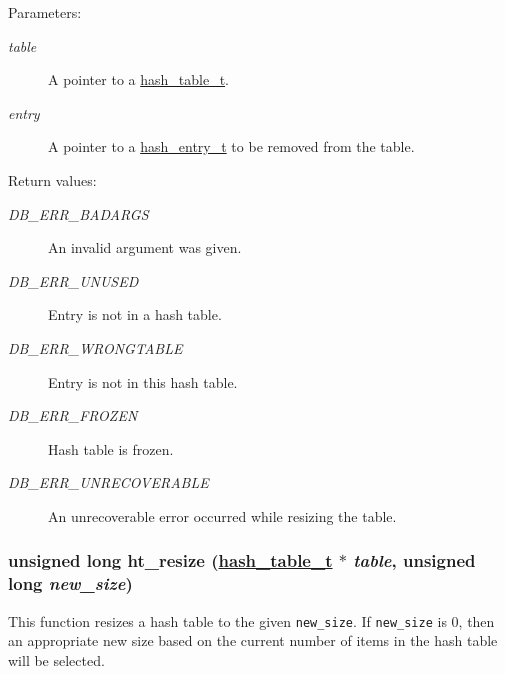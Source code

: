 \begin{Desc}
\item[Parameters:]
\begin{description}
\item[{\em table}]A pointer to a \hyperlink{group__dbprim__hash_a0}{hash\_\-table\_\-t}. \item[{\em entry}]A pointer to a \hyperlink{group__dbprim__hash_a1}{hash\_\-entry\_\-t} to be removed from the table.\end{description}
\end{Desc}
\begin{Desc}
\item[Return values:]
\begin{description}
\item[{\em DB\_\-ERR\_\-BADARGS}]An invalid argument was given. \item[{\em DB\_\-ERR\_\-UNUSED}]Entry is not in a hash table. \item[{\em DB\_\-ERR\_\-WRONGTABLE}]Entry is not in this hash table. \item[{\em DB\_\-ERR\_\-FROZEN}]Hash table is frozen. \item[{\em DB\_\-ERR\_\-UNRECOVERABLE}]An unrecoverable error occurred while resizing the table. \end{description}
\end{Desc}
\hypertarget{group__dbprim__hash_a13}{
\subsubsection[ht\_\-resize]{\setlength{\rightskip}{0pt plus 5cm}unsigned long ht\_\-resize (\hyperlink{dbprim_8h_a0}{hash\_\-table\_\-t} $\ast$ {\em table}, unsigned long {\em new\_\-size})}}
\label{group__dbprim__hash_a13}


This function resizes a hash table to the given {\tt new\_\-size}. If {\tt new\_\-size} is 0, then an appropriate new size based on the current number of items in the hash table will be selected.

